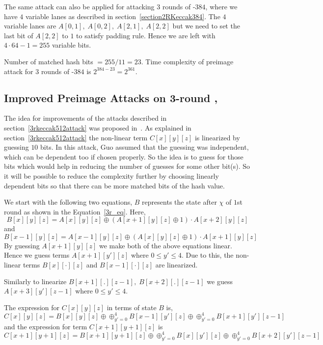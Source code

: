 	The same attack can also be applied for attacking $3$ rounds of \KECCAK-$384$, where we have $4$ variable lanes as described in section~\ref{section2RKeccak384}. The $4$ variable lanes are $A[0,1],\; A[0,2],\; A[2,1],\; A[2,2]$ but we need to set the last bit of $A[2,2]$ to $1$ to satisfy padding rule. Hence we are left with $4 \cdot 64 - 1 = 255$ variable bits.
    
    Number of matched hash bits $ = 255/11 = 23 $. Time complexity of preimage attack for $3$ rounds of \KECCAK-$384$ is $ 2^{384 - 23} = 2^{361}$.

\subsection{Improved Preimage Attacks on 3-round , }
\label{improvedkeccak512}

    The idea for improvements of the attacks described in section~\ref{3rkeccak512attack} was proposed in~\cite{guo2016linear}. As explained in section~\ref{3rkeccak512attack} the non-linear term $C[x][y][z]$ is linearized by guessing $10$ bits. In this attack, Guo \etal assumed that the guessing was independent, which can be dependent too if chosen properly. So the idea is to guess for those bits which would help in reducing the number of guesses for some other bit(s). So it will be possible to reduce the complexity further by choosing linearly dependent bits so that there can be more matched bits of the hash value.

    We start with the following two equations, $B$ represents the state after $\chi$ of $1$st round as shown in the Equation~\ref{3r_eq}. Here,
        \[
            B[x][y][z] = A[x][y][z] \oplus (A[x+1][y][z] \oplus 1) \cdot A[x+2][y][z]
        \] and
        \[
            B[x-1][y][z] = A[x-1][y][z] \oplus (A[x][y][z] \oplus 1) \cdot A[x+1][y][z]
        \]
        By guessing $A[x+1][y][z]$ we make both of the above equations linear. Hence we guess terms $A[x+1][y'][z]$ where $0 \leq y' \leq 4$. Due to this, the non-linear terms $B[x][\cdot][z]$ and $B[x-1][\cdot][z]$ are linearized.
        
        Similarly to linearize $B[x+1][.][z-1],\; B[x+2][.][z-1]$ we guess $A[x+3][y'][z-1]$ where $0 \leq y' \leq 4$.
        
        The expression for $C[x][y][z]$ in terms of state $B$ is,        
        \[
        C[x][y][z] = B[x][y][z] \oplus \oplus_{y' = 0}^{4} B[x-1][y'][z] \oplus \oplus_{y' = 0}^{4} B[x+1][y'][z-1]
    \] and the expression for term $C[x+1][y+1][z]$ is 
        \[
        C[x+1][y+1][z] = B[x+1][y+1][z] \oplus \oplus_{y' = 0}^{4} B[x][y'][z] \oplus \oplus_{y' = 0}^{4} B[x+2][y'][z-1]
    \]
    

